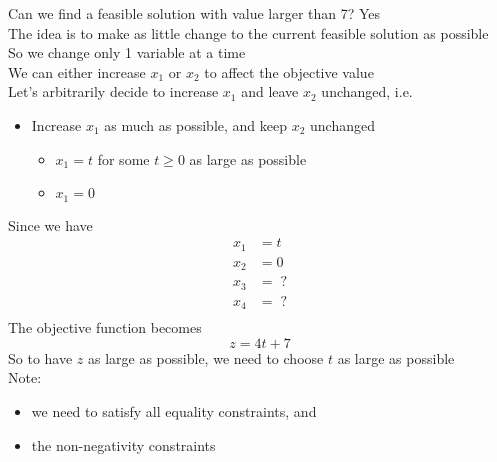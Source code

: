 \documentclass[letterpaper, 12pt]{article}
\begin{document}
    Can we find a feasible solution with value larger than 7? Yes\\
    \bigskip
    The idea is to make as little change to the current feasible solution as possible\\
    So we change only 1 variable at a time\\
    We can either increase $x_1$ or $x_2$ to affect the objective value\\
    Let's arbitrarily decide to increase $x_1$ and leave $x_2$ unchanged, i.e.\\
    \begin{itemize}
        \item Increase $x_1$ as much as possible, and keep $x_2$ unchanged
        \begin{itemize}
            \item $x_1 = t$ for some $t \geq 0$ as large as possible
            \item $x_1 = 0$
        \end{itemize}
    \end{itemize}
    \pagebreak
    Since we have\\
    \begin{align*}
        x_1 &= t\\
        x_2 &= 0\\
        x_3 &= \; ?\\
        x_4 &= \; ?\\
    \end{align*}
    The objective function becomes\\
    $$z = 4t + 7$$
    So to have $z$ as large as possible, we need to choose $t$ as large as possible\\
    Note:
    \begin{itemize}
        \item we need to satisfy all equality constraints, and
        \item the non-negativity constraints
    \end{itemize}
\end{document}
